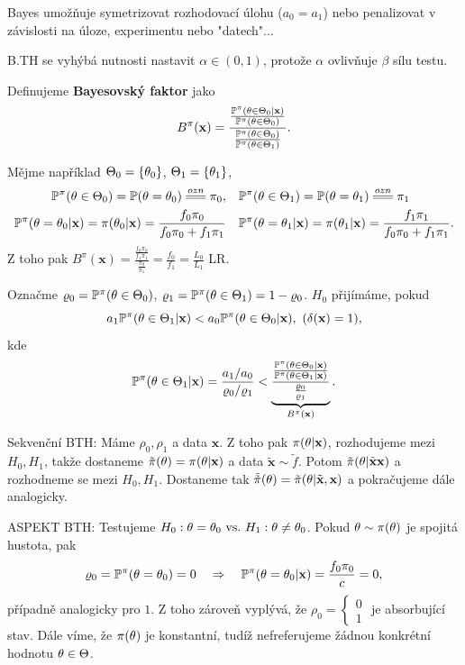 \begin{remark}
	Bayes umožňuje symetrizovat rozhodovací úlohu ($a_0=a_1$) nebo penalizovat v závislosti na úloze, experimentu nebo "datech"...
	
	B.TH se vyhýbá nutnosti nastavit $\alpha\in(0,1)$, protože $\alpha$ ovlivňuje $\beta$ sílu testu.
\end{remark}
\begin{define}
	Definujeme \textbf{Bayesovský faktor} jako$$ B^\pi(\textbf{x})=\frac{\frac{\mathbb{P}^\pi(\theta\in\Theta_0|\textbf{x})}{\mathbb{P}^\pi(\theta\in\Theta_0)}}{\frac{\mathbb{P}^\pi(\theta\in\Theta_0)}{\mathbb{P}^\pi(\theta\in\Theta_1)}}.$$
\end{define}
\begin{remark}
	Mějme například $\Theta_0=\{\theta_0\}$, $\Theta_1=\{\theta_1\}$, \[
	\begin{split}
	\PP^\pi(\t\in\Theta_0)=\PP(\t=\t_0)\equal{ozn}\pi_0,&\quad \PP^\pi(\t\in\Theta_1)=\PP(\t=\t_1)\equal{ozn}\pi_1\\ \PP^\pi(\t=\t_0|\textbf{x})=\pi(\t_0|\textbf{x})=\frac{f_0\pi_0}{f_0\pi_0+f_1\pi_1}&\quad \PP^\pi(\t=\t_1|\textbf{x})=\pi(\t_1|\textbf{x})=\frac{f_1\pi_1}{f_0\pi_0+f_1\pi_1}.
	\end{split}
	\]Z toho pak 
	$ B^\pi(\textbf{x})=\frac{\frac{f_0\pi_0}{f_1\pi_1}}{\frac{\pi_0}{\pi_1}}=\frac{f_0}{f_1}=\frac{L_0}{L_1}$ LR.
\end{remark}

Označme $\varrho_0=\mathbb{P}^\pi(\theta\in\Theta_0)$, $\varrho_1=\mathbb{P}^\pi(\theta\in\Theta_1)=1-\varrho_0$. $H_0$ přijímáme, pokud $$a_1 \mathbb{P}^\pi(\theta\in\Theta_1|\textbf{x})<a_0\mathbb{P}^\pi(\theta\in\Theta_0|\textbf{x}),~(\delta(\textbf{x})=1),$$ 
kde 
$$ \mathbb{P}^\pi(\theta\in\Theta_1|\textbf{x})=\frac{a_1/a_0}{\varrho_0/\varrho_1}<\underbrace{\frac{\frac{\mathbb{P}^\pi(\theta\in\Theta_0|\textbf{x})}{\mathbb{P}^\pi(\theta\in\Theta_1|\textbf{x})}}{\frac{\varrho_0}{\varrho_1}}}_{B^\pi(\textbf{x})}.$$
\begin{remark}
	Sekvenční BTH: Máme $\rho_0,\rho_1$ a data $\textbf{x}$. Z toho pak $\pi(\theta|\textbf{x})$, rozhodujeme mezi $H_0,H_1$, takže dostaneme $\tilde{\pi}(\theta)=\pi(\theta|\textbf{x})$ a data $\tilde{\textbf{x}}\sim \tilde{f}$. Potom $\tilde{\pi}(\theta|\tilde{\textbf{x}}\textbf{x})$ a rozhodneme se mezi $H_0,H_1$. Dostaneme tak $\tilde{\tilde{\pi}}(\theta)=\tilde{\pi}(\theta|\tilde{\textbf{x}},\textbf{x})$ a pokračujeme dále analogicky.
\end{remark}


ASPEKT BTH:
Testujeme $H_0: \theta=\theta_0 ~\text{vs.}~ H_1: \theta\neq\theta_0$. Pokud $\theta\sim\pi(\theta)$ je spojitá hustota, pak 
$$ \varrho_0=\mathbb{P}^\pi(\theta=\theta_0)=0\quad\Rightarrow\quad \mathbb{P}^\pi(\theta=\theta_0|\textbf{x})=\frac{f_0\pi_0}{c}=0,$$
případně analogicky pro $1$. Z toho zároveň vyplývá, že $\rho_0=\begin{cases}
0\\1
\end{cases}$ je absorbující stav. Dále víme, že $\pi(\theta)$ je konstantní, tudíž nefreferujeme žádnou konkrétní hodnotu $\theta\in\Theta$. 

